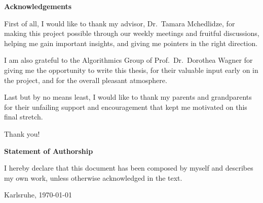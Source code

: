 \thispagestyle{plain}

\centerline{\textbf{Acknowledgements}}
\vspace{0.25cm}

First of all, I would like to thank my advisor, {Dr.~Tamara Mchedlidze}, for making this project possible through our weekly meetings and fruitful discussions, helping me gain important insights, and giving me pointers in the right direction.

I am also grateful to the Algorithmics Group of {Prof.~Dr.~Dorothea Wagner} for giving me the opportunity to write this thesis, for their valuable input early on in the project, and for the overall pleasant atmosphere.

Last but by no means least, I would like to thank my parents and grandparents for their unfailing support and encouragement that kept me motivated on this final stretch.

Thank you!

\vspace*{\fill}



\centerline{\textbf{Statement of Authorship}}
\vspace{0.25cm}

I hereby declare that this document has been composed by myself and describes my own work, unless otherwise acknowledged in the text.

\vspace{2.5cm}

\noindent
\makebox[7.5cm]{\hrulefill}

\hspace{0.25cm}
Karlsruhe, \today

\vspace{2cm}
